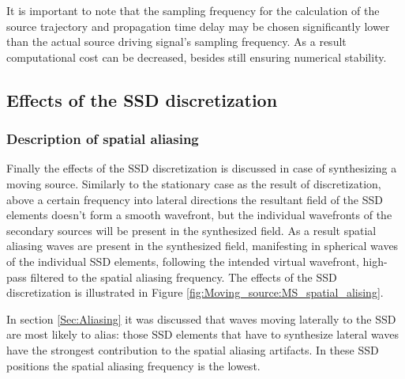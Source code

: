 It is important to note that the sampling frequency for the calculation of the source trajectory and propagation time delay may be chosen significantly lower than the actual source driving signal's sampling frequency.
As a result computational cost can be decreased, besides still ensuring numerical stability. 

\subsection{Effects of the SSD discretization}

\subsubsection{Description of spatial aliasing}
Finally the effects of the SSD discretization is discussed in case of synthesizing a moving source.
Similarly to the stationary case as the result of discretization, above a certain frequency into lateral directions the resultant field of the SSD elements doesn't form a smooth wavefront, but the individual wavefronts of the secondary sources will be present in the synthesized field.
As a result spatial aliasing waves are present in the synthesized field, manifesting in spherical waves of the individual SSD elements, following the intended virtual wavefront, high-pass filtered to the spatial aliasing frequency.
The effects of the SSD discretization is illustrated in Figure \ref{fig:Moving_source:MS_spatial_alising}.

In section \ref{Sec:Aliasing} it was discussed that waves moving laterally to the SSD are most likely to alias: those SSD elements that have to synthesize lateral waves have the strongest contribution to the spatial aliasing artifacts.
In these SSD positions the spatial aliasing frequency is the lowest.

